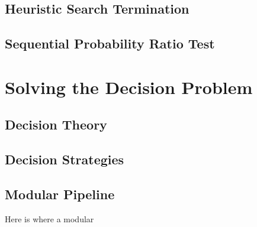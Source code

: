 \subsection{Heuristic Search Termination}
\subsection{Sequential Probability Ratio Test}

\section{Solving the Decision Problem}
\subsection{Decision Theory}

\subsection{Decision Strategies}

\subsection{Modular Pipeline}
Here is where a modular 

